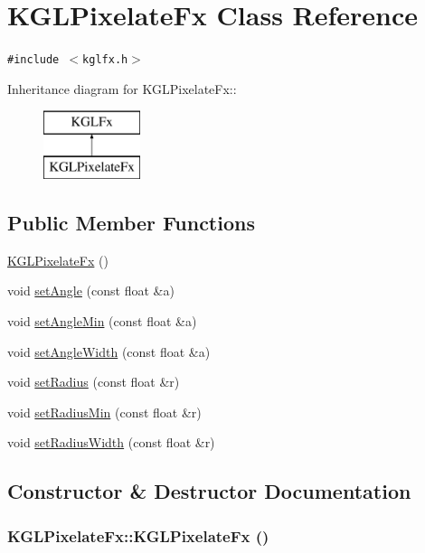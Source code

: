 \hypertarget{class_k_g_l_pixelate_fx}{
\section{KGLPixelateFx Class Reference}
\label{class_k_g_l_pixelate_fx}
}
{\tt \#include $<$kglfx.h$>$}

Inheritance diagram for KGLPixelateFx::\begin{figure}[H]
\begin{center}
\leavevmode
\includegraphics[height=2cm]{class_k_g_l_pixelate_fx}
\end{center}
\end{figure}
\subsection*{Public Member Functions}
\begin{CompactItemize}
\item 
\hyperlink{class_k_g_l_pixelate_fx_ed6f07a2e5ed5818d171e95f9ecac592}{KGLPixelateFx} ()
\item 
void \hyperlink{class_k_g_l_pixelate_fx_204ec29ca116f9fd7ba83b0d269529b6}{setAngle} (const float \&a)
\item 
void \hyperlink{class_k_g_l_pixelate_fx_fec0e778766d9ef081b3d676b90993f4}{setAngleMin} (const float \&a)
\item 
void \hyperlink{class_k_g_l_pixelate_fx_4f4806fa9000a7d9cb1b299107d4bdb2}{setAngleWidth} (const float \&a)
\item 
void \hyperlink{class_k_g_l_pixelate_fx_78842d2a1c034c8144688a07205b8c14}{setRadius} (const float \&r)
\item 
void \hyperlink{class_k_g_l_pixelate_fx_820ae55f76af24a334f80cd0d805f762}{setRadiusMin} (const float \&r)
\item 
void \hyperlink{class_k_g_l_pixelate_fx_b846b6766342b4bc502d73afad6b7094}{setRadiusWidth} (const float \&r)
\end{CompactItemize}


\subsection{Constructor \& Destructor Documentation}
\hypertarget{class_k_g_l_pixelate_fx_ed6f07a2e5ed5818d171e95f9ecac592}{
\subsubsection[{KGLPixelateFx}]{\setlength{\rightskip}{0pt plus 5cm}KGLPixelateFx::KGLPixelateFx ()}}
\label{class_k_g_l_pixelate_fx_ed6f07a2e5ed5818d171e95f9ecac592}




